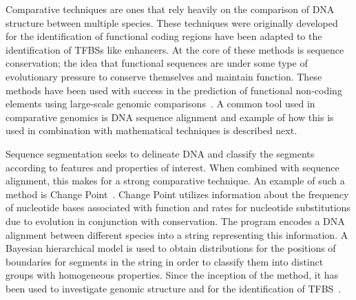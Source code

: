         Comparative techniques are ones that rely heavily on the comparison of DNA structure between multiple species.
        These techniques were originally developed for the identification of functional coding regions have been adapted to the identification of TFBSs like enhancers. At the core of these methods is sequence conservation; the idea that functional sequences are under some type of evolutionary pressure to conserve themselves and maintain function. These methods have been used with success in the prediction of functional non-coding elements using large-scale genomic comparisons~\cite{aparicio2002whole, gottgens2000analysis, loots2000identification, mouse2002initial}. A common tool used in comparative genomics is DNA sequence alignment and example of how this is used in combination with mathematical techniques is described next.

        
        Sequence segmentation seeks to delineate DNA and classify the segments according to features and properties of interest. When combined with sequence alignment, this makes for a strong comparative technique.
        An example of such a method is Change Point~\cite{keith2006segmenting}. Change Point utilizes information about the frequency of nucleotide bases associated with function and rates for nucleotide substitutions due to evolution in conjunction with conservation. The program encodes a DNA alignment between different species into a string representing this information. A Bayesian hierarchical model is used to obtain distributions for the positions of boundaries for segments in the string in order to classify them into distinct groups with homogeneous properties. Since the inception of the method, it has been used to investigate genomic structure and for the identification of TFBS~\cite{algama2014investigating, algama2017genome}. 
        
